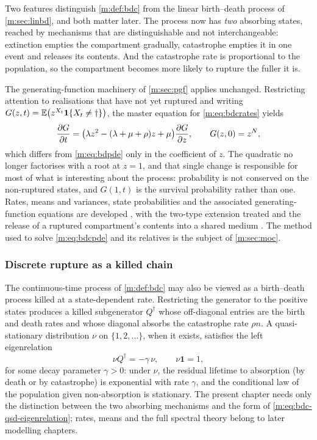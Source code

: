 Two features distinguish \cref{m:def:bdc} from the linear birth--death process of
\cref{m:sec:linbd}, and both matter later. The process now has \emph{two} absorbing
states, reached by mechanisms that are distinguishable and not interchangeable:
extinction empties the compartment gradually, catastrophe empties it in one event
and releases its contents. And the catastrophe rate is proportional to the
population, so the compartment becomes more likely to rupture the fuller it is.

The generating-function machinery of \cref{m:sec:pgf} applies unchanged. Restricting
attention to realisations that have not yet ruptured and writing
$G(z,t) = \mathbb{E}\!\left(z^{X_t}\mathbf 1\{X_t\neq\dagger\}\right)$, the master equation for
\cref{m:eq:bdcrates} yields
\begin{equation}
\label{m:eq:bdcpde}
\frac{\partial G}{\partial t} = \bigl(\lambda z^2-(\lambda+\mu+\rho)z+\mu\bigr)\frac{\partial G}{\partial z},
\qquad G(z,0) = z^{N},
\end{equation}
which differs from \cref{m:eq:bdpde} only in the coefficient of $z$. The quadratic no
longer factorises with a root at $z=1$, and that single change is responsible for
most of what is interesting about the process: probability is not conserved on the
non-ruptured states, and $G(1,t)$ is the survival probability rather than one.
Rates, means and variances, state probabilities and the associated
generating-function equations are developed , with the two-type extension treated
 and the release of a
ruptured compartment's contents into a shared medium
. The method used to solve
\cref{m:eq:bdcpde} and its relatives is the subject of \cref{m:sec:moc}.



\subsubsection*{Discrete rupture as a killed chain}
\label{m:sec:killed-bdc}

The continuous-time process of \cref{m:def:bdc} may also be viewed as a birth--death
process killed at a state-dependent rate. Restricting the generator to the positive
states produces a killed subgenerator $Q^\dagger$ whose off-diagonal entries are the
birth and death rates and whose diagonal absorbs the catastrophe rate $\rho n$. A
quasi-stationary distribution $\nu$ on $\{1,2,\dots\}$, when it exists, satisfies
the left eigenrelation
\begin{equation}
\label{m:eq:bdc-qsd-eigenrelation}
\nu Q^\dagger = -\gamma\,\nu,
\qquad \nu\mathbf 1=1,
\end{equation}
for some decay parameter $\gamma>0$: under $\nu$, the residual lifetime to absorption
(by death or by catastrophe) is exponential with rate $\gamma$, and the conditional
law of the population given non-absorption is stationary. The present chapter needs
only the distinction between the two absorbing mechanisms and the form of
\cref{m:eq:bdc-qsd-eigenrelation}; rates, means and the full spectral theory belong
to later modelling chapters.

